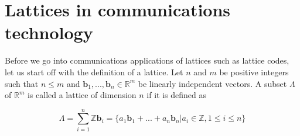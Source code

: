 \documentclass[english,12pt,a4paper,pdftex,sci,utf8]{aaltothesis}
\begin{document}
\clearpage

\section{Lattices in communications technology}

Before we go into communications applications of lattices such as lattice codes, let us start off with the definition of a lattice. Let $n$ and $m$ be positive integers such that $n \leq m$ and $\mathbf{b}_1, ... , \mathbf{b}_n \in \mathbb{R}^m$ be linearly independent vectors. A subset $\Lambda$ of $\mathbb{R}^m$ is called a lattice of dimension $n$ if it is defined as

\begin{equation}
\Lambda = \sum_{i=1}^{n} \mathbb{Z}\mathbf{b}_i = \{a_1\mathbf{b}_1 + ...+a_n\mathbf{b}_n | a_i \in \mathbb{Z}, 1 \leq i \leq n\}\label{eq:lattice}
\end{equation}
\end{document}
